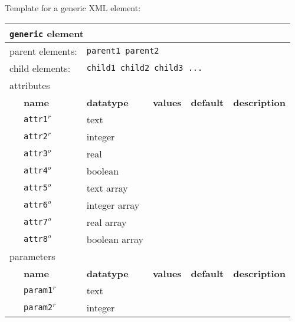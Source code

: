 Template for a generic XML element:
\FloatBarrier
\begin{table}[h]
\begin{center}
\begin{tabularx}{\textwidth}{l l l l l l }
\hline
\multicolumn{6}{l}{\texttt{generic} element} \\
\hline
\multicolumn{2}{l}{parent elements:} & \multicolumn{4}{l}{\texttt{parent1 parent2}}\\
\multicolumn{2}{l}{child  elements:} & \multicolumn{4}{l}{\texttt{child1 child2 child3 ...}}\\
\multicolumn{2}{l}{attributes}  & \multicolumn{4}{l}{}\\
   &   \bfseries name     & \bfseries datatype & \bfseries values & \bfseries default   & \bfseries description \\
   &   \texttt{attr1}$^r$ &  text              &                  &                     &                       \\
   &   \texttt{attr2}$^r$ &  integer           &                  &                     &                       \\
   &   \texttt{attr3}$^o$ &  real              &                  &                     &                       \\
   &   \texttt{attr4}$^o$ &  boolean           &                  &                     &                       \\
   &   \texttt{attr5}$^o$ &  text array        &                  &                     &                       \\
   &   \texttt{attr6}$^o$ &  integer array     &                  &                     &                       \\
   &   \texttt{attr7}$^o$ &  real array        &                  &                     &                       \\
   &   \texttt{attr8}$^o$ &  boolean array     &                  &                     &                       \\
\multicolumn{2}{l}{parameters}  & \multicolumn{4}{l}{}\\
   &   \bfseries name     & \bfseries datatype & \bfseries values & \bfseries default   & \bfseries description \\
   &   \texttt{param1}$^r$&  text              &                  &                     &                       \\
   &   \texttt{param2}$^r$&  integer           &                  &                     &                       \\

\end{tabularx}
\end{center}
\end{table}

